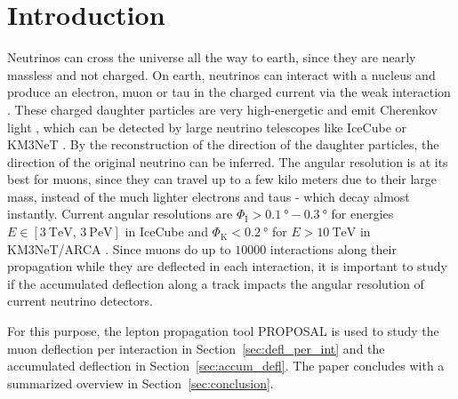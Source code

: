 \section{Introduction}\label{sec:introduction}
Neutrinos can cross the universe all the way to earth, since they are 
nearly massless and not charged. On earth, neutrinos can interact 
with a nucleus and produce an electron, muon or tau in the charged current 
via the weak interaction \cite{}. These charged daughter particles are very 
high-energetic and emit Cherenkov light \cite{}, which can be detected 
by large neutrino telescopes like IceCube \cite{IceCube_Instrumentation} or 
KM3NeT \cite{KM3NeT_Design}. 
By the reconstruction of the direction of the daughter particles, the direction 
of the original neutrino can be inferred. The angular resolution is at its 
best for muons, since they can travel up to a few kilo meters due to their 
large mass, instead of the much lighter electrons and taus - which decay almost 
instantly. Current angular resolutions are 
$\Phi_{\text{I}} > \SI{0.1}{\degree} - \SI{0.3}{\degree}$ for energies 
$E \in [\SI{3}{\tera\electronvolt},\,\SI{3}{\peta\electronvolt}]$ in IceCube 
\cite{IceCube_Resolution2021} 
and 
$\Phi_{\text{K}} < \SI{0.2}{\degree}$ for $E > \SI{10}{\tera\electronvolt}$ in 
KM3NeT/ARCA \cite{KM3NeT_Resolution2021}.
Since muons do up to $\num{10000}$ interactions along their propagation while they 
are deflected in each interaction, it is important to study if the accumulated 
deflection along a track impacts the angular resolution of current 
neutrino detectors. 

For this purpose, the lepton propagation 
tool PROPOSAL \cite{koehne2013proposal, dunsch_2018_proposal_improvements} is used to study the muon deflection per interaction in 
Section~\ref{sec:defl_per_int} and the 
accumulated deflection in Section~\ref{sec:accum_defl}. The 
paper concludes with a summarized overview in Section~\ref{sec:conclusion}.




